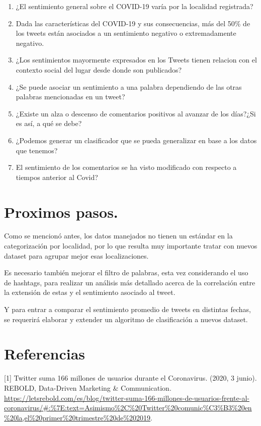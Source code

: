 \documentclass[
]{article}
\providecommand{\tightlist}{%
  \setlength{\itemsep}{0pt}\setlength{\parskip}{0pt}}
\begin{document}
\begin{enumerate}
\def\labelenumi{\arabic{enumi}.}
\tightlist
\item
  ¿El sentimiento general sobre el COVID-19 varía por la localidad
  registrada?
\item
  Dada las características del COVID-19 y sus consecuencias, más del
  50\% de los tweets están asociados a un sentimiento negativo o
  extremadamente negativo.
\item
  ¿Los sentimientos mayormente expresados en los Tweets tienen relacion
  con el contexto social del lugar desde donde son publicados?
\item
  ¿Se puede asociar un sentimiento a una palabra dependiendo de las
  otras palabras mencionadas en un tweet?
\item
  ¿Existe un alza o descenso de comentarios positivos al avanzar de los
  días?¿Si es así, a qué se debe?
\item
  ¿Podemos generar un clasificador que se pueda generalizar en base a
  los datos que tenemos?
\item
  El sentimiento de los comentarios se ha visto modificado con respecto
  a tiempos anterior al Covid?
\end{enumerate}

\hypertarget{proximos-pasos.}{%
\section{Proximos pasos.}\label{proximos-pasos.}}

Como se mencionó antes, los datos manejados no tienen un estándar en la
categorización por localidad, por lo que resulta muy importante tratar
con nuevos dataset para agrupar mejor esas localizaciones.

Es necesario también mejorar el filtro de palabras, esta vez
considerando el uso de hashtags, para realizar un análisis más detallado
acerca de la correlación entre la extensión de estas y el sentimiento
asociado al tweet.

Y para entrar a comparar el sentimiento promedio de tweets en distintas
fechas, se requerirá elaborar y extender un algoritmo de clasificación a
nuevos dataset.

\hypertarget{referencias}{%
\section{Referencias}\label{referencias}}

{[}1{]} Twitter suma 166 millones de usuarios durante el Coronavirus.
(2020, 3 junio). REBOLD, Data-Driven Marketing \& Communication.
\url{https://letsrebold.com/es/blog/twitter-suma-166-millones-de-usuarios-frente-al-coronavirus/\#:\%7E:text=Asimismo\%2C\%20Twitter\%20comunic\%C3\%B3\%20en\%20la,el\%20primer\%20trimestre\%20de\%202019}.
\end{document}

